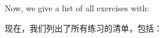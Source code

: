 \begin{dispListing}
\tcbstoprecording
\end{dispListing}
\tcbusetemp

\bigskip

Now, we give a list of all exercises with:

现在，我们列出了所有练习的清单，包括：
\begin{dispListing}
\end{dispListing}
\tcbusetemp